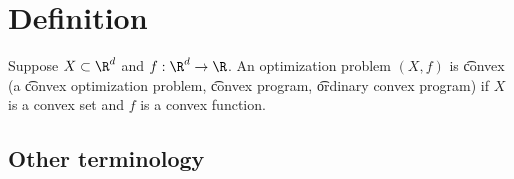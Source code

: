 
\section*{Definition}

Suppose $X \subset \R ^d$ and $f: \R ^d \to \R $.
An optimization problem $(X, f)$ is \t{convex} (a \t{convex optimization problem}, \t{convex program}, \t{ordinary convex program}) if $X$ is a convex set and $f$ is a convex function.

\subsection*{Other terminology}

\blankpage